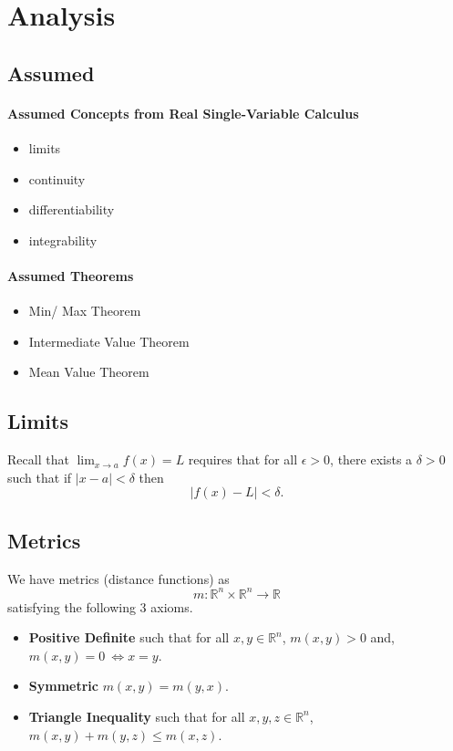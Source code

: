 
\section{Analysis}

\subsection{Assumed}
\paragraph{Assumed Concepts from Real Single-Variable Calculus}
\begin{itemize}
    \item limits
    \item continuity
    \item differentiability
    \item integrability
\end{itemize}

\paragraph{Assumed Theorems}
\begin{itemize}
    \item Min/ Max Theorem
    \item Intermediate Value Theorem
    \item Mean Value Theorem
\end{itemize}

\subsection{Limits}
Recall that \(\lim_{x\to a} f(x) = L\) requires that for all
\(\epsilon > 0\), there exists a \(\delta > 0\) such that
if \(|x-a| < \delta\)
then
\[|f(x) - L|  < \delta.\]



\subsection{Metrics}
We have metrics (distance functions) as
\[m: \mathbb{R}^n\times\mathbb{R}^n \to \mathbb{R}\]
satisfying the following 3 axioms.
\begin{itemize}
    \item \textbf{Positive Definite} such that for all \(x,y\in\mathbb{R}^n\),
    \(m(x,y) > 0\) and, \(m(x,y) = 0\ \Leftrightarrow x = y\).
    \item \textbf{Symmetric} \(m(x,y) = m(y, x)\).
    \item \textbf{Triangle Inequality} such that for all \(x,y,z\in\mathbb{R}^n\),
    \(m(x,y) + m(y, z) \leq m(x, z)\).
\end{itemize}

